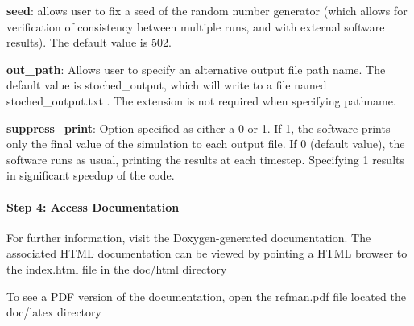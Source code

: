 {\bfseries seed}\+: allows user to fix a seed of the random number generator (which allows for verification of consistency between multiple runs, and with external software results). The default value is 502.

{\bfseries out\+\_\+path}\+: Allows user to specify an alternative output file path name. The default value is stoched\+\_\+output, which will write to a file named stoched\+\_\+output.\+txt . The extension is not required when specifying pathname.

{\bfseries suppress\+\_\+print}\+: Option specified as either a 0 or 1. If 1, the software prints only the final value of the simulation to each output file. If 0 (default value), the software runs as usual, printing the results at each timestep. Specifying 1 results in significant speedup of the code.

\paragraph*{Step 4\+: Access Documentation}

For further information, visit the Doxygen-\/generated documentation. The associated H\+T\+ML documentation can be viewed by pointing a H\+T\+ML browser to the index.\+html file in the doc/html directory

To see a P\+DF version of the documentation, open the refman.\+pdf file located the doc/latex directory 